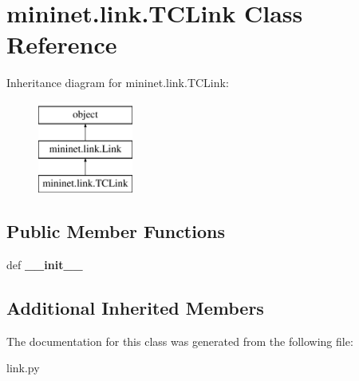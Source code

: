 \hypertarget{classmininet_1_1link_1_1TCLink}{\section{mininet.\-link.\-T\-C\-Link Class Reference}
\label{classmininet_1_1link_1_1TCLink}
}
Inheritance diagram for mininet.\-link.\-T\-C\-Link\-:\begin{figure}[H]
\begin{center}
\leavevmode
\includegraphics[height=3.000000cm]{classmininet_1_1link_1_1TCLink}
\end{center}
\end{figure}
\subsection*{Public Member Functions}
\begin{DoxyCompactItemize}
\item 
\hypertarget{classmininet_1_1link_1_1TCLink_a443b8c7bf82abbe41eac677d788bfbc1}{def {\bfseries \-\_\-\-\_\-init\-\_\-\-\_\-}}\label{classmininet_1_1link_1_1TCLink_a443b8c7bf82abbe41eac677d788bfbc1}

\end{DoxyCompactItemize}
\subsection*{Additional Inherited Members}


The documentation for this class was generated from the following file\-:\begin{DoxyCompactItemize}
\item 
link.\-py\end{DoxyCompactItemize}
